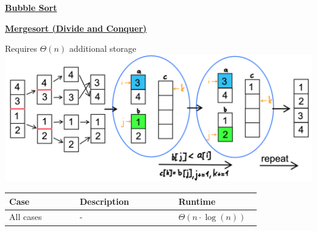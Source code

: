     {\centering\underline{\textbf{Bubble Sort}} \par}
        
    {\centering\underline{\textbf{Mergesort (Divide and Conquer)}} \par}
        Requires $\Theta(n)$ additional storage\\
        \includegraphics[width = \linewidth]{src/3_containers/images/mergesort.png}
          

        

        \begin{tabular*}{\linewidth}{| p{0.25\linewidth} | p{0.35\linewidth} | p{0.22\linewidth} |}
            \hline
            Case & Description & Runtime\\
            \hline \hline
            All cases & - & $\Theta (n \cdot \log(n))$ \\
            \hline
        \end{tabular*}
    
